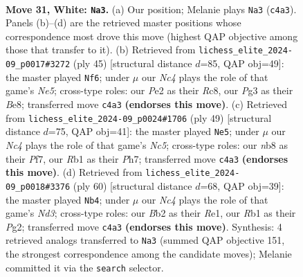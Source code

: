 \documentclass[11pt]{article}
\begin{document}
\begin{figure}[p]\centering
\begin{subfigure}{0.46\textwidth}\centering
\resizebox{\linewidth}{!}{%
\newchessgame
\chessboard[
  setfen={1nb5/rp1n2k1/5pp1/p2p3p/1bN5/1P2P1PP/PBB1PK2/1R6 w - - 0 31},
  showmover=false,
  pgfstyle=straightmove, color=movearrow, markmove={c4-a3}
]}
\caption{}
\end{subfigure}\hfill
\begin{subfigure}{0.46\textwidth}\centering
\resizebox{\linewidth}{!}{%
\newchessgame
\chessboard[
  setfen={2r1bk2/1p3ppp/4p3/p1b5/P2NnB2/1BP2P2/1P4PP/3R2K1 b - - 0 23},
  showmover=false,
  pgfstyle=straightmove, color=movearrow, markmove={e4-f6}
]}
\caption{}
\end{subfigure}
\\[4pt]
\begin{subfigure}{0.46\textwidth}\centering
\resizebox{\linewidth}{!}{%
\newchessgame
\chessboard[
  setfen={6k1/p4ppp/1p3b2/3p3b/2nN4/1PP2P2/P3BKPP/R1B4r b - - 0 25},
  showmover=false,
  pgfstyle=straightmove, color=movearrow, markmove={c4-e5}
]}
\caption{}
\end{subfigure}\hfill
\begin{subfigure}{0.46\textwidth}\centering
\resizebox{\linewidth}{!}{%
\newchessgame
\chessboard[
  setfen={8/p1k1n3/5b1p/1p1rpppP/8/P1PN1P2/1PK3P1/2B1R3 w - - 0 31},
  showmover=false,
  pgfstyle=straightmove, color=movearrow, markmove={d3-b4}
]}
\caption{}
\end{subfigure}
\caption{\textbf{Move 31, White: \texttt{Na3}.} (a) Our position; Melanie plays \texttt{Na3} (\texttt{c4a3}). Panels (b)--(d) are the retrieved master positions whose correspondence most drove this move (highest QAP objective among those that transfer to it). (b) Retrieved from \texttt{lichess\_elite\_2024-09\_p0017\#3272} (ply 45) [structural distance $d$=85, QAP obj=49]: the master played \texttt{Nf6}; under $\mu$ our \emph{Nc4} plays the role of that game's \emph{Ne5}; cross-type roles: our \emph{P}e2 as their \emph{R}c8, our \emph{P}g3 as their \emph{B}e8; transferred move \texttt{c4a3} \textbf{(endorses this move)}. (c) Retrieved from \texttt{lichess\_elite\_2024-09\_p0024\#1706} (ply 49) [structural distance $d$=75, QAP obj=41]: the master played \texttt{Ne5}; under $\mu$ our \emph{Nc4} plays the role of that game's \emph{Nc5}; cross-type roles: our \emph{n}b8 as their \emph{P}f7, our \emph{R}b1 as their \emph{P}h7; transferred move \texttt{c4a3} \textbf{(endorses this move)}. (d) Retrieved from \texttt{lichess\_elite\_2024-09\_p0018\#3376} (ply 60) [structural distance $d$=68, QAP obj=39]: the master played \texttt{Nb4}; under $\mu$ our \emph{Nc4} plays the role of that game's \emph{Nd3}; cross-type roles: our \emph{B}b2 as their \emph{R}e1, our \emph{R}b1 as their \emph{P}g2; transferred move \texttt{c4a3} \textbf{(endorses this move)}. Synthesis: 4 retrieved analogs transferred to \texttt{Na3} (summed QAP objective 151, the strongest correspondence among the candidate moves); Melanie committed it via the \texttt{search} selector.}
\label{fig:thought-m60}
\end{figure}
\end{document}
